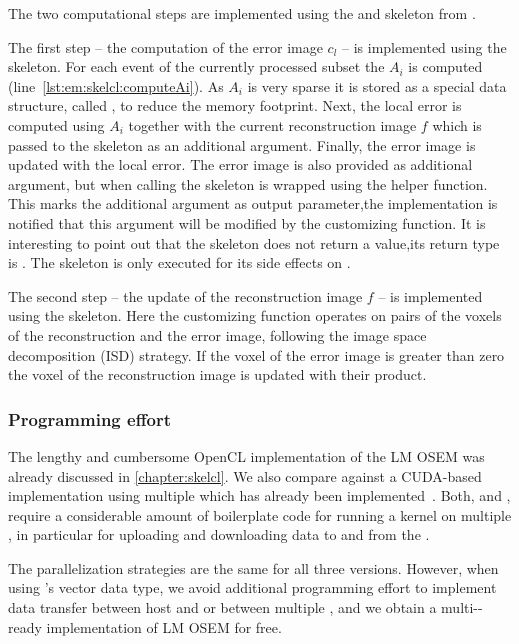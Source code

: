 The two computational steps are implemented using the \map and \zip skeleton from \SkelCL.

The first step -- the computation of the error image $c_l$ -- is implemented using the \map skeleton.
For each event  of the currently processed subset the $A_i$ is computed (line~\ref{lst:em:skelcl:computeAi}).
As $A_i$ is very sparse it is stored as a special data structure, called , to reduce the memory footprint.
Next, the local error is computed using $A_i$ together with the current reconstruction image $f$ which is passed to the \map skeleton as an additional argument.
Finally, the error image  is updated with the local error.
The error image is also provided as additional argument, but when calling the \map skeleton  is wrapped using the  helper function.
This marks the additional argument as output parameter,\ie the \SkelCL implementation is notified that this argument will be modified by the customizing function.
It is interesting to point out that the \map skeleton does not return a value,\ie its return type is .
The skeleton is only executed for its side effects on .

The second step -- the update of the reconstruction image $f$ -- is implemented using the \zip skeleton.
Here the customizing function operates on pairs of the voxels of the reconstruction and the error image, following the image space decomposition (ISD) strategy.
If the voxel of the error image is greater than zero the voxel of the reconstruction image is updated with their product.







\subsubsection*{Programming effort}
The lengthy and cumbersome OpenCL implementation of the LM OSEM was already discussed in \autoref{chapter:skelcl}.
We also compare against a CUDA-based implementation using multiple \GPUs which has already been implemented~\cite{SchellmannGoMeKoScWuBu2009}.
Both, \CUDA and \OpenCL, require a considerable amount of boilerplate code for running a kernel on multiple \GPUs, in particular for uploading and downloading data to and from the \GPUs.

The parallelization strategies are the same for all three versions.
However, when using \SkelCL's vector data type, we avoid additional programming effort to implement data transfer between host and \GPU or between multiple \GPUs, and we obtain a multi-\GPU-ready implementation of LM OSEM for free.

